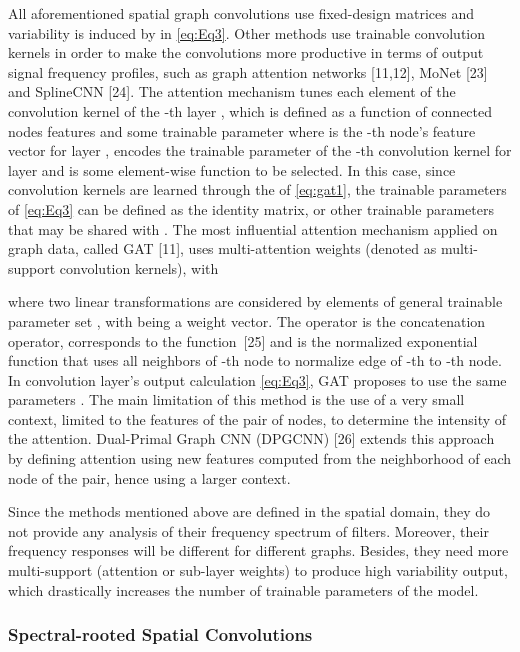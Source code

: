 \documentclass{article}
\begin{document}
All aforementioned spatial graph convolutions use fixed-design matrices  and variability is induced by  in \eqref{eq:Eq3}. Other methods use trainable convolution kernels in order to make the convolutions more productive in terms of output signal frequency profiles, such as graph attention networks [11,12], MoNet [23] and SplineCNN [24]. The attention mechanism tunes each element of the convolution kernel of the -th layer , which is defined as a function of connected nodes features and some trainable parameter
where  is the -th node's feature vector for layer ,  encodes the trainable parameter of the -th convolution kernel for layer  and  is some element-wise function to be selected.
In this case, since convolution kernels are learned through the  of \eqref{eq:gat1}, the trainable parameters   of \eqref{eq:Eq3} can be defined as the identity matrix, or other trainable parameters that may be shared with .
The most influential attention mechanism applied on graph data, called GAT [11], uses multi-attention weights (denoted as multi-support convolution kernels), with 

where two linear transformations
are considered by elements of general trainable parameter
  set , with  being a weight vector. The operator  is the concatenation
operator,  corresponds to the 
function~[25] and  is the normalized exponential function that uses all neighbors of -th node to normalize edge of -th to -th node. In convolution layer's output calculation \eqref{eq:Eq3}, GAT proposes to use the same
parameters . 
The main limitation
of this  method is the use of a very small context, limited to the features of the pair of nodes, to determine the
intensity of the attention. 
Dual-Primal Graph CNN (DPGCNN)
[26] extends this approach by defining attention using new features
computed from the
neighborhood of each node of the pair, hence using a larger
context. 

Since the methods mentioned above are defined in the spatial domain,
they do not provide any analysis of their frequency spectrum of
filters. Moreover, their frequency responses will be different for
different graphs. Besides, they need more multi-support (attention or
sub-layer weights) to produce high variability output, which drastically increases the number of trainable parameters of the model.

\subsubsection{Spectral-rooted Spatial Convolutions}
\end{document}
